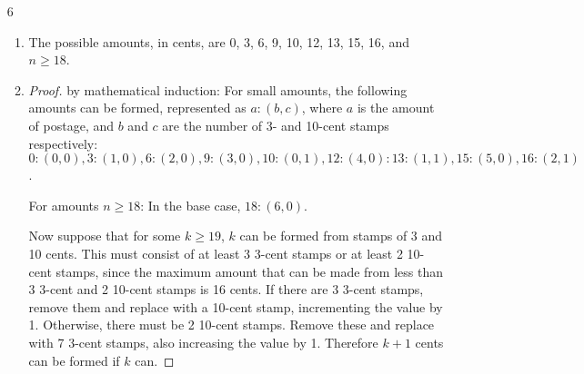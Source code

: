 \documentclass{article}
\begin{document}
\begin{enumerate}
\begin{enumerate}
\begin{proof}
          For 21 cents of stamps, take three seven-cent stamps.
        \end{proof}
      \item The inductive hypothesis of a proof by strong induction that $P(n)$
        is true for all integers $n \geq 18$ is that $P(1), P(2), \dots P(n-1)$
        are all true.
      \item In the inductive step, we need to prove that for some $P(n)$, if
        the inductive hypothesis holds, then $P(n)$ is true.
      \item
        \begin{proof}
          Suppose any amount 18 or more which is less than $k$ can be made up
          of stamps of denominations of four and seven cents. Since $k\geq21$,
          either $k=21$ or $k \geq 22$. If $k=21$, then $k$ can be made up of
          3 7-cent stamps. If $k \geq 22$, then $k-4 \geq 18$, and so by the
          inductive hypothesis can be made into a combination of four and seven
          cent stamps. Then $k$ an be made of the combination of $k-4$ and an
          additional four-cent stamp.
        \end{proof}
      \item Since the base cases were true, and all following cases were true
        if the base cases were true, then all cases greater than or equal to
        the base case must be true.
    \end{enumerate}
  \item[6]
    \begin{enumerate}
      \item The possible amounts, in cents, are 0, 3, 6, 9, 10, 12, 13, 15, 16,
        and $n \geq 18$.
      \item
        \begin{proof} by mathematical induction:
          For small amounts, the following amounts can be formed, represented
          as $a: (b,c)$, where $a$ is the amount of postage, and $b$ and $c$
          are the number of 3- and 10-cent stamps respectively: $0: (0,0),
          3: (1,0), 6: (2,0), 9: (3,0), 10: (0,1), 12: (4,0): 13: (1,1),
          15: (5,0), 16: (2,1)$.

          For amounts $n \geq 18$: In the base case, $18: (6,0)$.

          Now suppose that for some $k \geq 19$, $k$ can be formed from stamps
          of 3 and 10 cents. This must consist of at least 3 3-cent stamps
          or at least 2 10-cent stamps, since the maximum amount that can
          be made from less than 3 3-cent and 2 10-cent stamps is 16 cents.
          If there are 3 3-cent stamps, remove them and replace with a 10-cent
          stamp, incrementing the value by 1. Otherwise, there must be 2
          10-cent stamps. Remove these and replace with 7 3-cent stamps,
          also increasing the value by 1. Therefore $k+1$ cents can be formed
          if $k$ can.


\end{proof}
\end{enumerate}
\end{enumerate}
\end{document}
